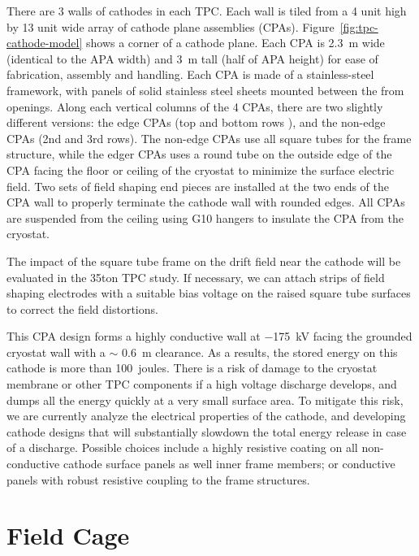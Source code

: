 There are 3 walls of cathodes in each TPC.  Each wall is tiled from a 4 unit high by 13 unit wide array of cathode plane assemblies (CPAs). Figure~\ref{fig:tpc-cathode-model} shows a corner of a cathode plane.  Each CPA is 2.3~m wide (identical to the APA width) and 3~m tall (half of APA height) for ease of fabrication, assembly and handling.  Each CPA is made of a stainless-steel framework, 
with panels of solid stainless steel sheets mounted between the from openings.  Along each vertical  columns of the 4 CPAs, there are two slightly different versions: the edge CPAs (top and bottom rows ), and the non-edge CPAs (2nd and 3rd rows).  The non-edge CPAs use all square tubes for the frame structure, while the edger CPAs uses a round tube on the outside edge of the CPA facing the floor or ceiling of the cryostat to minimize the surface electric field.  Two sets of field shaping end pieces are installed at the two ends of the CPA wall to properly terminate the cathode wall with rounded edges.  All CPAs are suspended from the ceiling using G10 hangers to insulate the CPA from the cryostat.


The impact of the square tube frame on the drift field near the cathode will be evaluated in the 35ton TPC study.  If necessary, we can attach strips of field shaping electrodes with a suitable bias voltage on the raised square tube surfaces to correct the field distortions.  


This CPA design forms a highly conductive wall at $-$175~kV facing the grounded cryostat wall with a $\sim$ 0.6~m clearance.  As a results, the stored energy on this cathode is more than 100~joules.  There is a risk of damage to the cryostat membrane or other TPC components if a high voltage discharge develops, and dumps all the energy quickly at a very small surface area. To mitigate this risk, we are currently analyze the electrical properties of the cathode, and developing cathode designs that will substantially slowdown the total energy release in case of a discharge.  Possible choices include a highly resistive coating on all non-conductive cathode surface panels as well inner frame members; or conductive panels with robust resistive coupling to the frame structures.




\section{Field Cage}
\label{subsec:v5-tpc-chamber-fieldcage}

